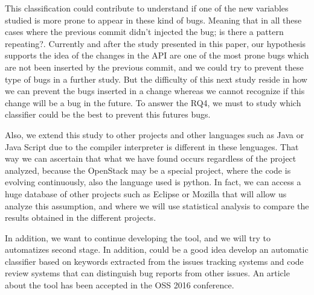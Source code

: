 \documentclass[ifip]{svmult}
\begin{document}
This classification could contribute to understand if one of the new variables studied is more prone to appear in these kind of bugs. Meaning that in all these cases where the previous commit didn't injected the bug; is there a pattern repeating?. Currently and after the study presented in this paper, our hypothesis supports the idea of the changes in the API are one of the most prone bugs which are not been inserted by the previous commit, and we could try to prevent these type of bugs in a further study. But the difficulty of this next study reside in how we can prevent the bugs inserted in a change whereas we cannot recognize if this change will be a bug in the future. To answer the RQ4, we must to study which classifier could be the best to prevent this futures bugs.

Also, we extend this study to other projects and other languages such as Java or Java Script due to the compiler interpreter is different in these lenguages. That way we can ascertain that what we have found occurs regardless of the project analyzed, because the OpenStack may be a special project, where the code is evolving continuously, also the language used is python. In fact, we can access a huge database of other projects such as Eclipse or Mozilla that will allow us analyze this assumption, and where we will use statistical analysis to compare the results obtained in the different projects. 

In addition, we want to continue developing the tool, and we will try to automatizes second stage. In addition, could be a good idea develop an automatic classifier based on keywords extracted from the issues tracking systems and code review systems that can distinguish bug reports from other issues. An article about the tool has been accepted in the OSS 2016 conference.



\end{document}
